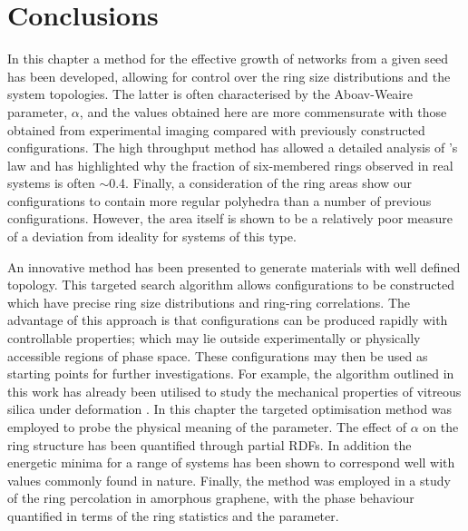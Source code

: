 \chapter{Conclusions}
\label{ch:conclusions}


In this chapter a method for the effective growth of \td{} networks from a given seed has been developed, allowing for control over the ring size distributions and the system topologies. 
The latter is often characterised by the Aboav-Weaire parameter, $\alpha$, and
the values obtained here are more commensurate with those obtained
from experimental imaging compared with previously constructed configurations.
The high throughput method has allowed a detailed analysis of \lm's
law and has highlighted why the fraction of six-membered rings observed
in real systems is often $\sim$0.4. 
Finally, a consideration of the ring areas show our configurations to contain more regular polyhedra than a number of previous configurations. 
However, the area itself is shown to be a relatively poor measure of a deviation from ideality for systems of this type.




An innovative method has been presented to generate \td{} materials with well defined topology. 
This targeted \mc{} search algorithm allows configurations to be constructed which have precise ring size distributions and ring\--ring correlations.
The advantage of this approach is that configurations can be produced rapidly with controllable properties; which may lie outside experimentally or physically accessible regions of phase space.
These configurations may then be used as starting points for further investigations.
For example, the algorithm outlined in this work has already been utilised to study the mechanical properties of vitreous silica under deformation \cite{Bamer2020,Ebrahem2020a,Whitaker2019}.
In this chapter the targeted optimisation method was employed to probe the physical meaning of the \aw{} parameter.
The effect of $\alpha$ on the ring structure has been quantified through partial RDFs.
In addition the energetic minima for a range of systems has been shown to correspond well with values commonly found in nature.
Finally, the method was employed in a study of the ring percolation in amorphous graphene, with the phase behaviour quantified in terms of the ring statistics and the \aw{} parameter.






